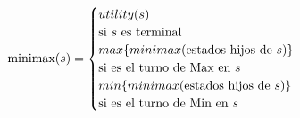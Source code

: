 \documentclass[preview]{standalone}
\begin{document}
\begin{align*}
\text{minimax($s$)} =  \begin{cases}
                                 utility(s) \qquad \cr \text{si $s$ es terminal} \cr
                                 max\{minimax(\text{estados hijos de $s$})\}\qquad \cr \text{si es el turno de Max en $s$} \cr
                                 min\{minimax(\text{estados hijos de $s$})\}\qquad \cr \text{si es el turno de Min en $s$} \cr
                                 \end{cases}
\end{align*}
\end{document}
